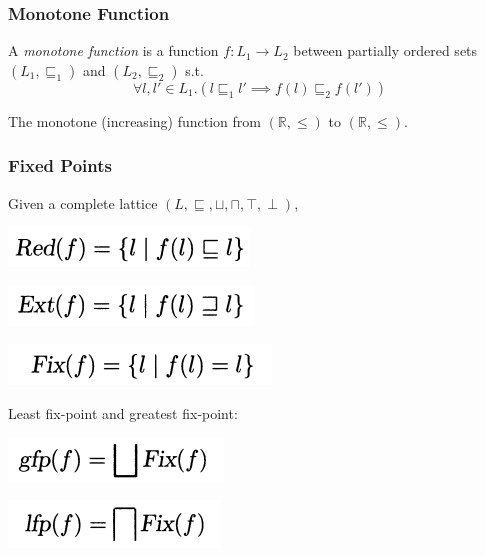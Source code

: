 \documentclass[aspectratio=1610, 13pt]{beamer}
\begin{document}
\begin{frame}\frametitle{Monotone Function}
\begin{definition}
A \emph{monotone function} is a function $f: L_1 \rightarrow L_2$ between partially ordered sets $(L_1, \sqsubseteq_1)$ and $(L_2, \sqsubseteq_2)$ s.t.
\[\forall l, l' \in L_1. (l \sqsubseteq_1 l' \implies f(l) \sqsubseteq_2 f(l'))\]

\end{definition}

\begin{example}
The monotone (increasing) function from $(\mathbb{R}, \le)$ to $(\mathbb{R}, \le)$.

\end{example}
\end{frame}

\begin{frame}\frametitle{Fixed Points}
Given a complete lattice $(L, \sqsubseteq, \sqcup, \sqcap, \top, \perp)$,
\begin{multicols}{2}
\begin{center}
\includegraphics[scale=0.4]{red.png}

\includegraphics[scale=0.4]{ext.png}

\includegraphics[scale=0.4]{fix.png}
\end{center}
Least fix-point and greatest fix-point:
\begin{center}
\includegraphics[scale=0.4]{gfp.png}

\includegraphics[scale=0.4]{lfp.png}
\end{center}



\end{multicols}
\end{frame}
\end{document}
